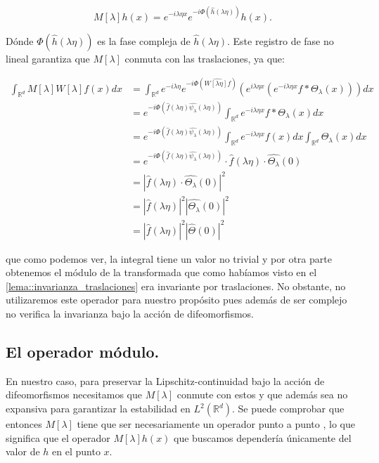 \begin{equation}
  M[\lambda]h(x)=e^{-i\lambda\eta x} e^{-i \Phi(\widehat{h}(\lambda\eta))}h(x).
\end{equation}

\noindent Dónde $\Phi(\widehat{h}(\lambda\eta))$ es la fase compleja de $\widehat{h}(\lambda\eta)$. Este registro de fase no lineal garantiza que $M[\lambda]$ conmuta con las traslaciones, ya que: 


\begin{align*}
  \int_{\mathbb{R}^d} M[\lambda]W[\lambda] f(x) dx &= \int_{\mathbb{R}^d} e^{-i\lambda \eta} e^{-i \Phi (\widehat{W[\lambda\eta]f})} \left( e^{i\lambda\eta x} \left( e^{-i\lambda\eta x} f \ast \Theta_\lambda (x)\right)\right) dx \\
  &= e^{-i \Phi (\widehat{f}(\lambda\eta)\widehat{\psi_\lambda}(\lambda\eta))} \int_{\mathbb{R}^d} e^{-i\lambda\eta x} f \ast \Theta_\lambda (x) dx \\
  &=e^{-i \Phi (\widehat{f}(\lambda\eta)\widehat{\psi_\lambda}(\lambda\eta))} \int_{\mathbb{R}^d}e^{-i\lambda\eta x} f(x) dx  \int_{\mathbb{R}^d}\Theta_\lambda (x) dx  \\
  &=e^{-i \Phi (\widehat{f}(\lambda\eta)\widehat{\psi_\lambda}(\lambda\eta))} \cdot \widehat{f}(\lambda\eta) \cdot  \widehat{\Theta_\lambda}(0)\\
  &=\left| \widehat{f}(\lambda\eta) \cdot  \widehat{\Theta_\lambda}(0) \right|^2 \\
  &=\left| \widehat{f}(\lambda\eta)\right|^2 \left| \widehat{\Theta_\lambda}(0) \right|^2  \\
  &=\left| \widehat{f}(\lambda\eta)\right|^2 \left| \widehat{\Theta}(0) \right|^2 
\end{align*}

\noindent que como podemos ver, la integral tiene un valor no trivial y por otra parte obtenemos el módulo de la transformada que como habíamos visto en el \autoref{lema::invarianza_traslaciones} era invariante por traslaciones. No obstante, no utilizaremos este operador para nuestro propósito pues además de ser complejo no verifica la invarianza bajo la acción de difeomorfismos.

\subsection{El operador módulo.}

\noindent En nuestro caso, para preservar la Lipschitz-continuidad bajo la acción de difeomorfismos necesitamos que $M[\lambda]$ conmute con estos y que además sea no expansiva para garantizar la estabilidad en $L^2(\mathbb{R}^d)$. Se puede comprobar que entonces $M[\lambda]$ tiene que ser necesariamente un operador punto a punto \cite{JBrunaOperatorsCommutingDiff}, lo que significa que el operador $M[\lambda]h(x)$ que buscamos dependería únicamente del valor de $h$ en el punto $x$.

